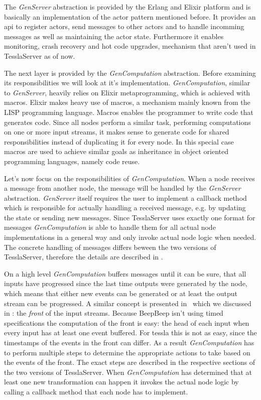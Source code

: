 The \emph{GenServer} abstraction is provided by the Erlang and Elixir platform and is basically an implementation of the actor pattern mentioned before.
It provides an \gls{api} to register actors, send messages to other actors and to handle incomming messages as well as maintaining the actor state.
Furthermore it enables monitoring, crash recovery and hot code upgrades, mechanism that aren't used in TesslaServer as of now.

The next layer is provided by the \emph{GenComputation} abstraction.
Before examining its responsibilities we will look at it's implementation.
\emph{GenComputation}, similar to \emph{GenServer}, heavily relies on Elixir metaprogramming, which is achieved with macros.
Elixir makes heavy use of macros, a mechanism mainly known from the LISP programming language.
Macros enables the programmer to write code that generates code.
Since all nodes perform a similar task, performing computations on one or more input streams, it makes sense to generate code for shared responsibilities instead of duplicating it for every node.
In this special case macros are used to achieve similar goals as inheritance in object oriented programming languages, namely code reuse.

Let's now focus on the responsibilities of \emph{GenComputation}.
When a node receives a message from another node, the message will be handled by the \emph{GenServer} abstraction.
\emph{GenServer} itself requires the user to implement a callback method which is responsible for actually handling a received message, e.g. by updating the state or sending new messages.
Since TesslaServer uses exactly one format for messages \emph{GenComputation} is able to handle them for all actual node implementations in a general way and only invoke actual node logic when needed.
The concrete handling of messages differs beween the two versions of TesslaServer, therefore the details are described in .

On a high level \emph{GenComputation} buffers messages until it can be sure, that all inputs have progressed since the last time outputs were generated by the node, which means that either new events can be generated or at least the output stream can be progressed.
A similar concept is presented in~\cite{Hall2011} which we discussed in : the \emph{front} of the input streams.
Because BeepBeep isn't using timed specifications the computation of the front is easy: the head of each input when every input has at least one event buffered.
For \gls{tessla} this is not as easy, since the timestamps of the events in the front can differ.
As a result \emph{GenComputation} has to perform multiple steps to determine the appropriate actions to take based on the events of the front.
The exact steps are described in the respective sections of the two versions of TesslaServer.
When \emph{GenComputation} has determined that at least one new transformation can happen it invokes the actual node logic by calling a callback method that each node has to implement.

